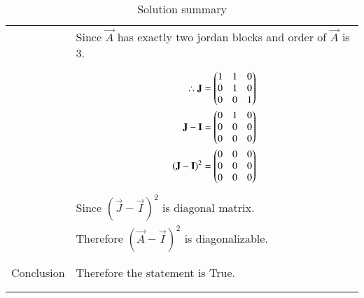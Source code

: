 \documentclass[journal,12pt]{IEEEtran}
\begin{document}
\begin{longtable}{|l|l|}
&Since $\vec{A}$ has exactly two jordan blocks and order of $\vec{A}$ is 3.\\
&\parbox{6cm}{\begin{align*}
    \therefore \mathbf{J}&=\begin{pmatrix}1&1&0\\0&1&0\\0&0&1\end{pmatrix}\\
    \mathbf{J}-\mathbf{I}&=\begin{pmatrix}0&1&0\\0&0&0\\0&0&0\end{pmatrix}\\
    (\mathbf{J}-\mathbf{I})^2&=\begin{pmatrix}0&0&0\\0&0&0\\0&0&0\end{pmatrix}
\end{align*}}\\
&Since $(\vec{J}-\vec{I})^2$ is diagonal matrix.\\
&Therefore $(\vec{A}-\vec{I})^2$ is diagonalizable.\\
&\\
\hline
&\\
Conclusion&Therefore the statement is True.\\
&\\
\hline
\caption{Solution summary}
\label{table:2}
\end{longtable}
\end{document}

